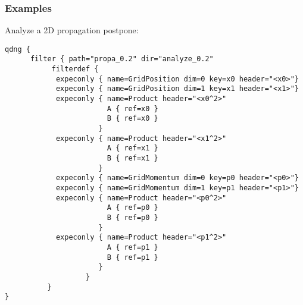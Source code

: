 \documentclass[a4paper,12pt]{scrbook}
\begin{document}
\subsubsection*{Examples}
Analyze a 2D propagation postpone:
\begin{verbatim}
qdng {
      filter { path="propa_0.2" dir="analyze_0.2"
           filterdef {
            expeconly { name=GridPosition dim=0 key=x0 header="<x0>"}
            expeconly { name=GridPosition dim=1 key=x1 header="<x1>"}
            expeconly { name=Product header="<x0^2>"
                        A { ref=x0 }
                        B { ref=x0 }
                      }
            expeconly { name=Product header="<x1^2>"
                        A { ref=x1 }
                        B { ref=x1 }
                      }
            expeconly { name=GridMomentum dim=0 key=p0 header="<p0>"}
            expeconly { name=GridMomentum dim=1 key=p1 header="<p1>"}
            expeconly { name=Product header="<p0^2>"
                        A { ref=p0 }
                        B { ref=p0 }
                      }
            expeconly { name=Product header="<p1^2>"
                        A { ref=p1 }
                        B { ref=p1 }
                      }
                   }
          }
} 
\end{verbatim}
\end{document}

